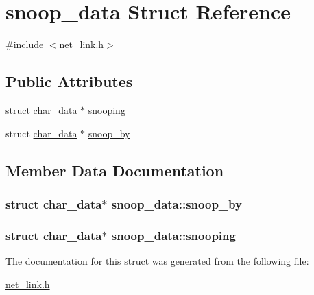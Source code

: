 \hypertarget{structsnoop__data}{\section{snoop\-\_\-data Struct Reference}
\label{structsnoop__data}
}


{\ttfamily \#include $<$net\-\_\-link.\-h$>$}

\subsection*{Public Attributes}
\begin{DoxyCompactItemize}
\item 
struct \hyperlink{structchar__data}{char\-\_\-data} $\ast$ \hyperlink{structsnoop__data_aeb670134f44fa1a13c78a066b1794853}{snooping}
\item 
struct \hyperlink{structchar__data}{char\-\_\-data} $\ast$ \hyperlink{structsnoop__data_a0cf73d853af690ef419aa79a10571e29}{snoop\-\_\-by}
\end{DoxyCompactItemize}


\subsection{Member Data Documentation}
\hypertarget{structsnoop__data_a0cf73d853af690ef419aa79a10571e29}{
\subsubsection[{snoop\-\_\-by}]{\setlength{\rightskip}{0pt plus 5cm}struct {\bf char\-\_\-data}$\ast$ snoop\-\_\-data\-::snoop\-\_\-by}}\label{structsnoop__data_a0cf73d853af690ef419aa79a10571e29}
\hypertarget{structsnoop__data_aeb670134f44fa1a13c78a066b1794853}{
\subsubsection[{snooping}]{\setlength{\rightskip}{0pt plus 5cm}struct {\bf char\-\_\-data}$\ast$ snoop\-\_\-data\-::snooping}}\label{structsnoop__data_aeb670134f44fa1a13c78a066b1794853}


The documentation for this struct was generated from the following file\-:\begin{DoxyCompactItemize}
\item 
\hyperlink{net__link_8h}{net\-\_\-link.\-h}\end{DoxyCompactItemize}
